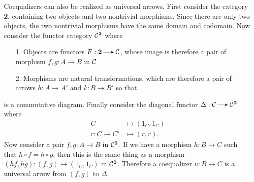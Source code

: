     Coequalizers can also be realized as universal arrows. First
    consider the category \textbf{2}, containing two objects and two nontrivial
    morphisms. Since there are only two objects, the two nontrivial
    morphisms have the same domain and codomain. Now consider the
    functor category $\mathcal{C}^\textbf{2}$ where
    \begin{itemize}
    \item[1.] Objects are functors $F: \textbf{2} \to \cc$, whose
    image is therefore a pair of morphism $f, g: A \to B$ in $\mathcal{C}$

    \item[2.] Morphisms are natural transformations, which are
    therefore a pair of arrows $h : A \to A'$ and $k: B \to B'$ so
    that
    \end{itemize}
    \begin{center}
    \end{center}
    is a commutative diagram. Finally consider the diagonal
    functor $\Delta: \cc \to \cc^\textbf{2}$ where 
    \begin{align*}
        C &\longmapsto (1_C, 1_C)\\
        r: C \to C' &\longmapsto (r, r).
    \end{align*}
    Now consider a pair $f, g: A \to B$ in $\mathcal{C}^{\textbf{2}}$. If
    we have a morphism $h: B \to C$ such that $h\circ f = h \circ
    g$, then this is the same thing as a morphism $(hf, hg): (f,
    g) \to (1_C, 1_C)$ in $\mathcal{C}^{\textbf{2}}$. Therefore a
    coequalizer $u: B \to C$ is a universal arrow from $(f, g)$ to
    $\Delta$. 

